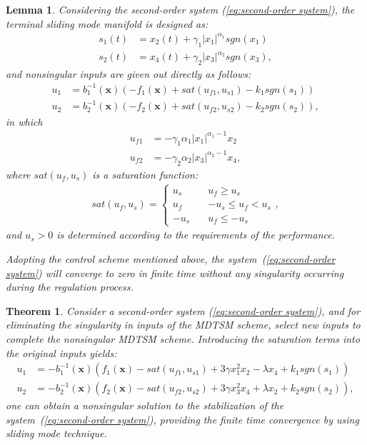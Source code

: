 \documentclass[3p]{elsarticle}
\theoremstyle{plain}
\newtheorem{mylem}{Lemma}
\newtheorem{mythm}{Theorem}
\theoremstyle{remark}
\begin{document}
\begin{mylem}\label{lemma:3}
Considering the second-order system (\ref{eq:second-order system}), the terminal sliding mode manifold is designed as:
\begin{align*}
s_1(t) &= x_2(t)+\gamma_1\vert x_1\vert^{\alpha_1}sgn(x_1)\\
s_2(t) &= x_4(t)+\gamma_2\vert x_3\vert^{\alpha_2}sgn(x_3),
\end{align*}
and nonsingular inputs are given out directly as follows:
\begin{align*}
u_1 &= b^{-1}_1(\bm x)(-f_1(\bm x)+sat(u_{f1},u_{s1})-k_1sgn(s_1))\\
u_2 &= b^{-1}_2(\bm x)(-f_2(\bm x)+sat(u_{f2},u_{s2})-k_2sgn(s_2)),
\end{align*}
in which
\begin{align*}
u_{f1}&=-\gamma_1\alpha_1\vert x_1\vert^{\alpha_1-1}x_2\\
u_{f2}&=-\gamma_2\alpha_2\vert x_3\vert^{\alpha_2-1}x_4,
\end{align*}
where $sat(u_f,u_s)$ is a saturation function:
\begin{align}
sat(u_f,u_s)=
\begin{cases}
u_s\quad &u_f\ge u_s\\
u_f\quad &-u_s\le u_f< u_s\\
-u_s\quad &u_f\le -u_s
\end{cases},
\end{align}
and $u_s>0$ is determined according to the requirements of the performance.\par
Adopting the control scheme mentioned above, the system~(\ref{eq:second-order system}) will converge to zero in finite time without any singularity occurring during the regulation process.
\end{mylem}
\begin{mythm}\label{theorem:3}
Consider a second-order system (\ref{eq:second-order system}), and for eliminating the singularity in inputs of the MDTSM scheme, select new inputs to complete the nonsingular MDTSM scheme. Introducing the saturation terms into the original inputs yields:
\begin{align}
u_1 &= -b_1^{-1}(\bm x)(f_1(\bm x)-sat(u_{f1},u_{s1})+3\gamma x_1^2x_2-\lambda x_4+k_1sgn(s_1))\\
u_2 &= -b_2^{-1}(\bm x)(f_2(\bm x)-sat(u_{f2},u_{s2})+3\gamma x_3^2x_4+\lambda x_2+k_2sgn(s_2)),\label{eq:nonsingular modified input}
\end{align}
one can obtain a nonsingular solution to the stabilization of the system~(\ref{eq:second-order system}), providing the finite time convergence by using sliding mode technique.
\end{mythm}
\end{document}
